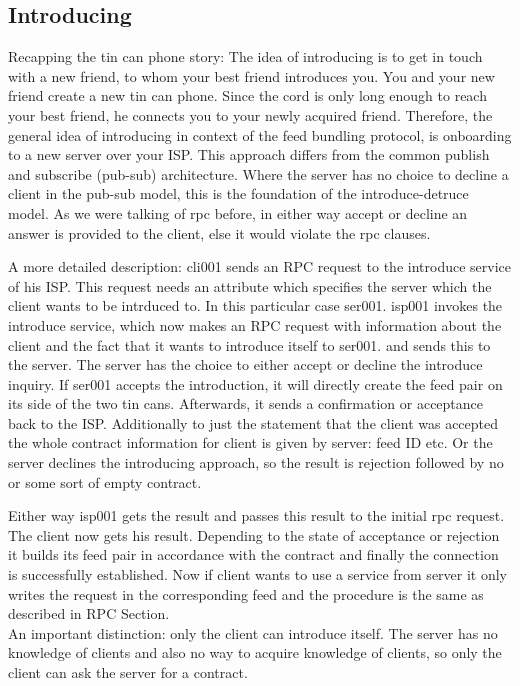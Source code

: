 \subsection{Introducing}
Recapping the tin can phone story: The idea of introducing is to get in touch with a new friend, to whom your best friend introduces you. You and your new friend create a new tin can phone. Since the cord is only long enough to reach your best friend, he connects you to your newly acquired friend. Therefore, the general idea of introducing in context of the feed bundling protocol, is onboarding to a new server over your ISP. This approach differs from the common publish and subscribe (pub-sub) architecture. Where the server has no choice to decline a client in the pub-sub model, this is the foundation of the introduce-detruce model. As we were talking of rpc before, in either way accept or decline an answer is provided to the client, else it would violate the rpc clauses.

A more detailed description: cli001 sends an RPC request to the introduce service of his ISP. This request needs an attribute which specifies the server which the client wants to be intrduced to. In this particular case ser001. isp001 invokes the introduce service, which now makes an RPC request with information about the client and the fact that it wants to introduce itself to ser001. and sends this to the server. The server has the choice to either accept or decline the introduce inquiry. If ser001 accepts the introduction, it will directly create the feed pair on its side of the two tin cans. Afterwards, it sends a confirmation or acceptance back to the ISP. Additionally to just the statement that the client was accepted the whole contract information for client is given by server: feed ID etc. 
Or the server declines the introducing approach, so the result is rejection followed by no or some sort of empty contract.

Either way isp001 gets the result and passes this result to the initial rpc request. The client now gets his result. Depending to the state of acceptance or rejection it builds its feed pair in accordance with the contract and finally the connection is successfully established. Now if client wants to use a service from server it only writes the request in the corresponding feed and the procedure is the same as described in RPC Section.
\\
An important distinction: only the client can introduce itself. The server has no knowledge of clients and also no way to acquire knowledge of clients, so only the client can ask the server for a contract. 

